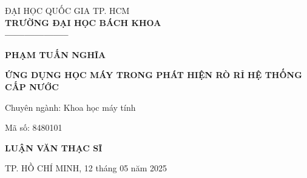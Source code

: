 \singlespacing
\begin{boxA}
\begin{titlepage}
\vspace{1em}

\begin{center}
    \fontsize{14}{20}\selectfont
    ĐẠI HỌC QUỐC GIA TP. HCM \\
    \bf TRƯỜNG ĐẠI HỌC BÁCH KHOA \\
  --------------------



\end{center}

\vspace{4em}

\begin{center}
    \fontsize{15}{20}\selectfont
    \textbf{PHẠM TUẤN NGHĨA} \\
\end{center}



\vspace{4em}
\begin{center}
    \fontsize{17}{25}\selectfont
    \textbf{ỨNG DỤNG HỌC MÁY TRONG PHÁT HIỆN RÒ RỈ HỆ THỐNG CẤP NƯỚC} \\
\end{center}
\vspace{2em}

\hspace{6em}Chuyên ngành: Khoa học máy tính

\hspace{6em}Mã số: 8480101

\vspace{4em}

\begin{center}
    \fontsize{21}{20}\selectfont
    \textbf{LUẬN VĂN THẠC SĨ} \\
\end{center}


\vspace{10em}

\begin{center}
\fontsize{12}{20}\selectfont
    TP. HỒ CHÍ MINH, 12 tháng 05 năm 2025 \\
\end{center}
\end{titlepage}
\end{boxA}
\onehalfspacing